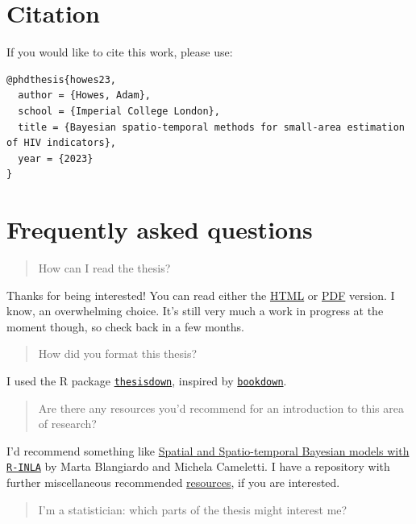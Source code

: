 \documentclass[a4paper, nobind]{templates/ociamthesis}
\begin{document}
\hypertarget{citation}{%
\section{Citation}\label{citation}}

If you would like to cite this work, please use:

\begin{verbatim}
@phdthesis{howes23,
  author = {Howes, Adam},
  school = {Imperial College London},
  title = {Bayesian spatio-temporal methods for small-area estimation of HIV indicators},
  year = {2023}
}
\end{verbatim}

\hypertarget{frequently-asked-questions}{%
\section{Frequently asked questions}\label{frequently-asked-questions}}

\begin{quote}
How can I read the thesis?
\end{quote}

Thanks for being interested!
You can read either the \href{https://athowes.github.io/thesis/}{HTML} or \href{https://athowes.github.io/thesis/main.pdf}{PDF} version.
I know, an overwhelming choice.
It's still very much a work in progress at the moment though, so check back in a few months.

\begin{quote}
How did you format this thesis?
\end{quote}

I used the R package \href{https://github.com/ismayc/thesisdown}{\texttt{thesisdown}}, inspired by \href{https://github.com/rstudio/bookdown}{\texttt{bookdown}}.

\begin{quote}
Are there any resources you'd recommend for an introduction to this area of research?
\end{quote}

I'd recommend something like \href{https://sites.google.com/a/r-inla.org/stbook/}{Spatial and Spatio-temporal Bayesian models with \texttt{R-INLA}} by Marta Blangiardo and Michela Cameletti.
I have a repository with further miscellaneous recommended \href{https://github.com/athowes/resources}{resources}, if you are interested.

\begin{quote}
I'm a statistician: which parts of the thesis might interest me?
\end{quote}
\end{document}
